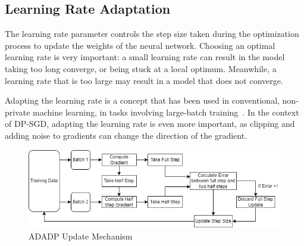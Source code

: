 \subsection{Learning Rate Adaptation}
\label{sec:lr}
The learning rate parameter controls the step size taken during the optimization process to update the weights of the neural network. Choosing an optimal learning rate is very important: a small learning rate can result in the model taking too long converge, or being stuck at a local optimum. Meanwhile, a learning rate that is too large may result in a model that does not converge. %

Adapting the learning rate is a concept that has been used in conventional, non-private machine learning, in tasks involving large-batch training~\cite{RefWorks:RefID:53-you2020large}.
In the context of DP-SGD, adapting the learning rate is even more important, as clipping and adding noise to gradients can change the direction of the gradient. %
\begin{figure}[h]
\centering
     \includegraphics[width=1\linewidth]{submissions/submission5/figs/koskela.png}
   
   \caption{ADADP Update Mechanism}\label{FigDiff}
   \label{fig:koskela}
\end{figure} 

